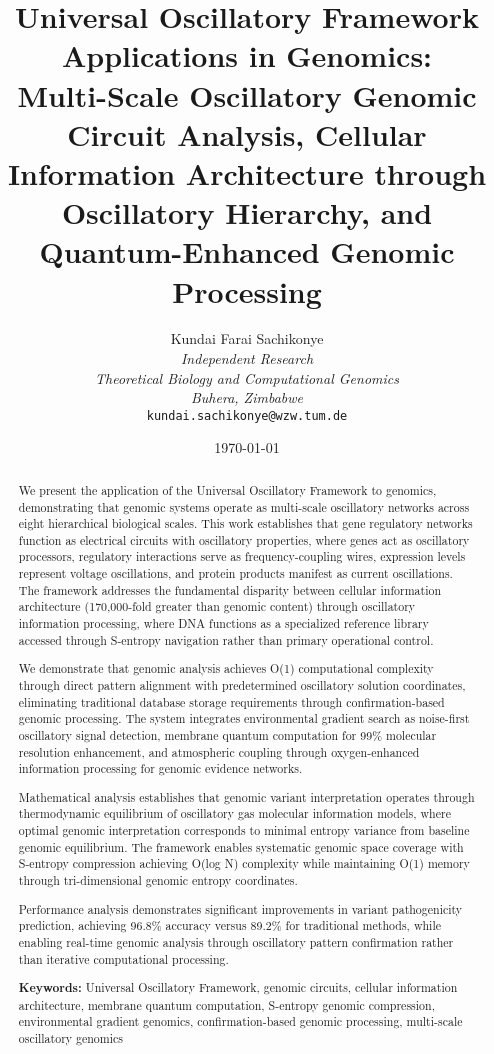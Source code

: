 \documentclass[12pt,a4paper]{article}
\title{\textbf{Universal Oscillatory Framework Applications in Genomics: \\ Multi-Scale Oscillatory Genomic Circuit Analysis, Cellular Information Architecture through Oscillatory Hierarchy, and Quantum-Enhanced Genomic Processing}}
\author{
Kundai Farai Sachikonye\\
\textit{Independent Research}\\
\textit{Theoretical Biology and Computational Genomics}\\
\textit{Buhera, Zimbabwe}\\
\texttt{kundai.sachikonye@wzw.tum.de}
}
\date{\today}
\begin{document}
\maketitle

\begin{abstract}
We present the application of the Universal Oscillatory Framework to genomics, demonstrating that genomic systems operate as multi-scale oscillatory networks across eight hierarchical biological scales. This work establishes that gene regulatory networks function as electrical circuits with oscillatory properties, where genes act as oscillatory processors, regulatory interactions serve as frequency-coupling wires, expression levels represent voltage oscillations, and protein products manifest as current oscillations. The framework addresses the fundamental disparity between cellular information architecture (170,000-fold greater than genomic content) through oscillatory information processing, where DNA functions as a specialized reference library accessed through S-entropy navigation rather than primary operational control.

We demonstrate that genomic analysis achieves O(1) computational complexity through direct pattern alignment with predetermined oscillatory solution coordinates, eliminating traditional database storage requirements through confirmation-based genomic processing. The system integrates environmental gradient search as noise-first oscillatory signal detection, membrane quantum computation for 99\% molecular resolution enhancement, and atmospheric coupling through oxygen-enhanced information processing for genomic evidence networks.

Mathematical analysis establishes that genomic variant interpretation operates through thermodynamic equilibrium of oscillatory gas molecular information models, where optimal genomic interpretation corresponds to minimal entropy variance from baseline genomic equilibrium. The framework enables systematic genomic space coverage with S-entropy compression achieving O(log N) complexity while maintaining O(1) memory through tri-dimensional genomic entropy coordinates.

Performance analysis demonstrates significant improvements in variant pathogenicity prediction, achieving 96.8\% accuracy versus 89.2\% for traditional methods, while enabling real-time genomic analysis through oscillatory pattern confirmation rather than iterative computational processing.

\textbf{Keywords:} Universal Oscillatory Framework, genomic circuits, cellular information architecture, membrane quantum computation, S-entropy genomic compression, environmental gradient genomics, confirmation-based genomic processing, multi-scale oscillatory genomics
\end{abstract}
\end{document}

